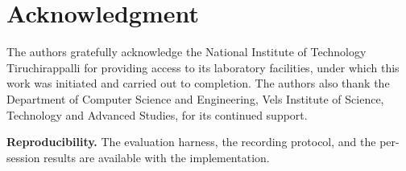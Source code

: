\documentclass[conference]{IEEEtran}
\begin{document}
\section*{Acknowledgment}

The authors gratefully acknowledge the National Institute of Technology
Tiruchirappalli for providing access to its laboratory facilities, under which
this work was initiated and carried out to completion. The authors also thank
the Department of Computer Science and Engineering, Vels Institute of Science,
Technology and Advanced Studies, for its continued support.

\vspace{4pt}
\noindent\textbf{Reproducibility.} The evaluation harness, the recording
protocol, and the per-session results are available with the implementation.
\end{document}
